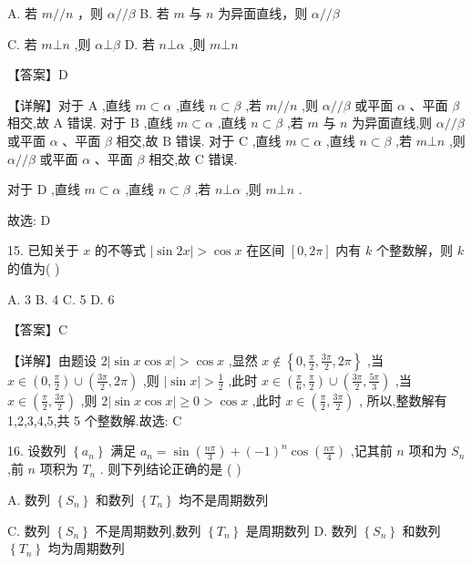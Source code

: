 \documentclass[10pt]{article}
\begin{document}
A. 若 \(m//n\) ，则 \(\alpha //\beta\) B. 若 \(m\) 与 \(n\) 为异面直线，则 \(\alpha //\beta\)

C. 若 \(m \bot  n\) ,则 \(\alpha  \bot  \beta\) D. 若 \(n \bot  \alpha\) ,则 \(m \bot  n\)

【答案】D

【详解】对于 \(\mathrm{A}\) ,直线 \(m \subset  \alpha\) ,直线 \(n \subset  \beta\) ,若 \(m//n\) ,则 \(\alpha //\beta\) 或平面 \(\alpha\) 、平面 \(\beta\) 相交,故 \(\mathrm{A}\) 错误. 对于 \(\mathrm{B}\) ,直线 \(m \subset  \alpha\) ,直线 \(n \subset  \beta\) ,若 \(m\) 与 \(n\) 为异面直线,则 \(\alpha //\beta\) 或平面 \(\alpha\) 、平面 \(\beta\) 相交,故 \(\mathrm{B}\) 错误. 对于 \(\mathrm{C}\) ,直线 \(m \subset  \alpha\) ,直线 \(n \subset  \beta\) ,若 \(m \bot  n\) ,则 \(\alpha //\beta\) 或平面 \(\alpha\) 、平面 \(\beta\) 相交,故 \(\mathrm{C}\) 错误.

对于 \(\mathrm{D}\) ,直线 \(m \subset  \alpha\) ,直线 \(n \subset  \beta\) ,若 \(n \bot  \alpha\) ,则 \(m \bot  n\) .

故选: D

15. 已知关于 \(x\) 的不等式 \(\left| {\sin {2x}}\right|  > \cos x\) 在区间 \(\left\lbrack  {0,{2\pi }}\right\rbrack\) 内有 \(k\) 个整数解，则 \(k\) 的值为( )

A. 3 B. 4 C. 5 D. 6

【答案】C

【详解】由题设 \(2\left| {\sin x\cos x}\right|  > \cos x\) ,显然 \(x \notin  \left\{  {0,\frac{\pi }{2},\frac{3\pi }{2},{2\pi }}\right\}\) ,当 \(x \in  \left( {0,\frac{\pi }{2}}\right)  \cup  \left( {\frac{3\pi }{2},{2\pi }}\right)\) ,则 \(\left| {\sin x}\right|  > \frac{1}{2}\) ,此时 \(x \in  \left( {\frac{\pi }{6},\frac{\pi }{2}}\right)  \cup  \left( {\frac{3\pi }{2},\frac{5\pi }{3}}\right)\) ,当 \(x \in  \left( {\frac{\pi }{2},\frac{3\pi }{2}}\right)\) ,则 \(2\left| {\sin x\cos x}\right|  \geq  0 > \cos x\) ,此时 \(x \in  \left( {\frac{\pi }{2},\frac{3\pi }{2}}\right)\) , 所以,整数解有1,2,3,4,5,共 5 个整数解.故选: \(\mathrm{C}\)

16. 设数列 \(\left\{  {a}_{n}\right\}\) 满足 \({a}_{n} = \sin \left( \frac{n\pi }{3}\right)  + {\left( -1\right) }^{n}\cos \left( \frac{n\pi }{4}\right)\) ,记其前 \(n\) 项和为 \({S}_{n}\) ,前 \(n\) 项积为 \({T}_{n}\) . 则下列结论正确的是 ( )

A. 数列 \(\left\{  {S}_{n}\right\}\) 和数列 \(\left\{  {T}_{n}\right\}\) 均不是周期数列

C. 数列 \(\left\{  {S}_{n}\right\}\) 不是周期数列,数列 \(\left\{  {T}_{n}\right\}\) 是周期数列 D. 数列 \(\left\{  {S}_{n}\right\}\) 和数列 \(\left\{  {T}_{n}\right\}\) 均为周期数列
\end{document}
